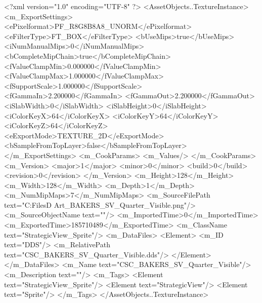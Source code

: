 <?xml version="1.0" encoding="UTF-8" ?>
<AssetObjects..TextureInstance>
	<m_ExportSettings>
		<ePixelformat>PF_R8G8B8A8_UNORM</ePixelformat>
		<eFilterType>FT_BOX</eFilterType>
		<bUseMips>true</bUseMips>
		<iNumManualMips>0</iNumManualMips>
		<bCompleteMipChain>true</bCompleteMipChain>
		<fValueClampMin>0.000000</fValueClampMin>
		<fValueClampMax>1.000000</fValueClampMax>
		<fSupportScale>1.000000</fSupportScale>
		<fGammaIn>2.200000</fGammaIn>
		<fGammaOut>2.200000</fGammaOut>
		<iSlabWidth>0</iSlabWidth>
		<iSlabHeight>0</iSlabHeight>
		<iColorKeyX>64</iColorKeyX>
		<iColorKeyY>64</iColorKeyY>
		<iColorKeyZ>64</iColorKeyZ>
		<eExportMode>TEXTURE_2D</eExportMode>
		<bSampleFromTopLayer>false</bSampleFromTopLayer>
	</m_ExportSettings>
	<m_CookParams>
		<m_Values/>
	</m_CookParams>
	<m_Version>
		<major>1</major>
		<minor>0</minor>
		<build>0</build>
		<revision>0</revision>
	</m_Version>
	<m_Height>128</m_Height>
	<m_Width>128</m_Width>
	<m_Depth>1</m_Depth>
	<m_NumMipMaps>7</m_NumMipMaps>
	<m_SourceFilePath text="C:\Users\Shadow\Desktop\Working Files\2D Art\Quarters\Bakers\StrategicView\CSC_BAKERS_SV_Quarter_Visible.png"/>
	<m_SourceObjectName text=""/>
	<m_ImportedTime>0</m_ImportedTime>
	<m_ExportedTime>185710489</m_ExportedTime>
	<m_ClassName text="StrategicView_Sprite"/>
	<m_DataFiles>
		<Element>
			<m_ID text="DDS"/>
			<m_RelativePath text="CSC_BAKERS_SV_Quarter_Visible.dds"/>
		</Element>
	</m_DataFiles>
	<m_Name text="CSC_BAKERS_SV_Quarter_Visible"/>
	<m_Description text=""/>
	<m_Tags>
		<Element text="StrategicView_Sprite"/>
		<Element text="StrategicView"/>
		<Element text="Sprite"/>
	</m_Tags>
</AssetObjects..TextureInstance>

